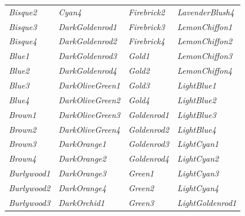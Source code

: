 \documentclass{article}
\newcommand\myfcolorbox[1]{\fcolorbox{black}{#1}{\phantom{\tiny{color}}} \textit{#1}\quad}
\begin{document}
\begin{center}
\begin{tabular}{llll}
			\myfcolorbox{Bisque2} & \myfcolorbox{Cyan4} & \myfcolorbox{Firebrick2} & \myfcolorbox{LavenderBlush4} \\
			
			\myfcolorbox{Bisque3} & \myfcolorbox{DarkGoldenrod1} & \myfcolorbox{Firebrick3} & \myfcolorbox{LemonChiffon1} \\
			
			\myfcolorbox{Bisque4} & \myfcolorbox{DarkGoldenrod2} & \myfcolorbox{Firebrick4} & \myfcolorbox{LemonChiffon2} \\
			
			\myfcolorbox{Blue1} & \myfcolorbox{DarkGoldenrod3} & \myfcolorbox{Gold1} & \myfcolorbox{LemonChiffon3} \\
			
			\myfcolorbox{Blue2} & \myfcolorbox{DarkGoldenrod4} & \myfcolorbox{Gold2} & \myfcolorbox{LemonChiffon4} \\
			
			\myfcolorbox{Blue3} & \myfcolorbox{DarkOliveGreen1} & \myfcolorbox{Gold3} & \myfcolorbox{LightBlue1} \\
			
			\myfcolorbox{Blue4} & \myfcolorbox{DarkOliveGreen2} & \myfcolorbox{Gold4} & \myfcolorbox{LightBlue2} \\
			
			\myfcolorbox{Brown1} & \myfcolorbox{DarkOliveGreen3} & \myfcolorbox{Goldenrod1} & \myfcolorbox{LightBlue3} \\
			
			\myfcolorbox{Brown2} & \myfcolorbox{DarkOliveGreen4} & \myfcolorbox{Goldenrod2} & \myfcolorbox{LightBlue4} \\
			
			\myfcolorbox{Brown3} & \myfcolorbox{DarkOrange1} & \myfcolorbox{Goldenrod3} & \myfcolorbox{LightCyan1} \\
			
			\myfcolorbox{Brown4} & \myfcolorbox{DarkOrange2} & \myfcolorbox{Goldenrod4} & \myfcolorbox{LightCyan2} \\
			
			\myfcolorbox{Burlywood1} & \myfcolorbox{DarkOrange3} & \myfcolorbox{Green1} & \myfcolorbox{LightCyan3} \\
			
			\myfcolorbox{Burlywood2} & \myfcolorbox{DarkOrange4} & \myfcolorbox{Green2} & \myfcolorbox{LightCyan4} \\
			
			\myfcolorbox{Burlywood3} & \myfcolorbox{DarkOrchid1} & \myfcolorbox{Green3} & \myfcolorbox{LightGoldenrod1} \\
			

\end{tabular}
\end{center}
\end{document}
